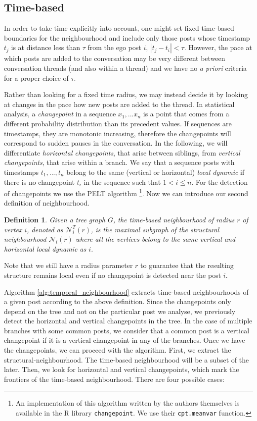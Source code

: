 \documentclass[conference]{IEEEtran}
\newtheorem{definition}{Definition}
\begin{document}
\subsection{Time-based}
In order to take time explicitly into account, one might set fixed time-based boundaries for the neighbourhood and include only those posts whose timestamp $t_j$ is at distance less than $\tau$ from the ego post $i$, $|t_j-t_i|<\tau$. However, the pace at which posts are added to the conversation may be very different between conversation threads (and also within a thread) and we have no \textit{a priori} criteria for a proper choice of $\tau$. 

Rather than looking for a fixed time radius, we may instead decide it by looking at changes in the pace how new posts are added to the thread. In statistical analysis, a \textit{changepoint} in a sequence $x_1,...x_n$ is a point that comes from a different probability distribution than its precedent values. If sequences are timestamps, they are monotonic increasing, therefore the changepoints will correspond to sudden pauses in the conversation. In the following, we will differentiate \textit{horizontal changepoints}, that arise between siblings, from \textit{vertical changepoints}, that arise within a branch. We say that a sequence posts with timestamps $t_1,...,t_n$ belong to the same (vertical or horizontal) \textit{local dynamic} if there is no changepoint $t_i$ in the sequence such that $1 < i \leq n$. For the detection of changepoints we use the PELT algorithm \cite{Killick2012}\footnote{An implementation of this algorithm written by the authors themselves is available in the R library \texttt{changepoint}. We use their \texttt{cpt.meanvar} function.}. Now we can introduce our second definition of neighbourhood.
\begin{definition}
Given a tree graph $G$, the \textit{time-based neighbourhood} of radius $r$ of vertex $i$, denoted as $\mathcal{N}_{i}^T(r)$, is the maximal subgraph of the structural neighbourhood $\mathcal{N}_i(r)$ where all the vertices  belong to the same vertical and horizontal local dynamic as $i$.
\end{definition}
Note that we still have a radius parameter $r$ to guarantee that the resulting structure remains local even if no changepoint is detected near the post $i$. 

Algorithm \ref{alg:temporal_neighbourhood} extracts time-based neighbourhoods of a given post according to the above definition. Since the changepoints only depend on the tree and not on the particular post we analyse, we previously detect the horizontal and vertical changepoints in the tree. In the case of multiple branches with some common posts, we consider that a common post is a vertical changepoint if it is a vertical changepoint in any of the branches. Once we have the changepoints, we can proceed with the algorithm. First, we extract the structural-neighbourhood. The time-based neighbourhood will be a subset of the later. Then, we look for horizontal and vertical changepoints, which mark the frontiers of the time-based neighbourhood. There are four possible cases:
\end{document}
